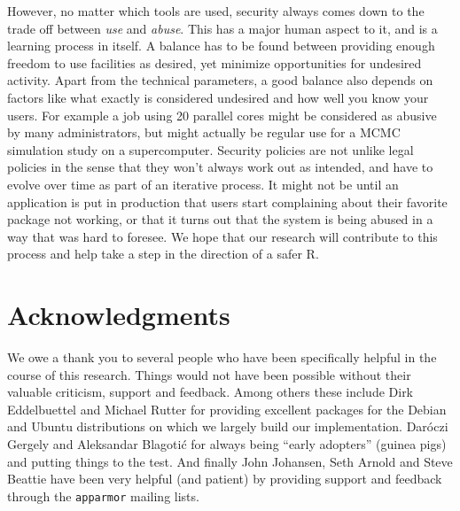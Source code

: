 \documentclass[article]{jss}
\newcommand{\R}{\textsf{R}\xspace}
\begin{document}
However, no matter which tools are used, security always comes down to the trade
off between \emph{use} and \emph{abuse}. This has a major human aspect to it,
and is a learning process in itself. A balance has to be found between providing
enough freedom to use facilities as desired, yet minimize opportunities for
undesired activity. Apart from the technical parameters, a good balance also
depends on factors like what exactly is considered undesired and how well you
know your users. For example a job using 20 parallel cores might be considered
as abusive by many administrators, but might actually be regular use for a MCMC
simulation study on a supercomputer. Security policies are not unlike legal
policies in the sense that they won't always work out as intended, and have to
evolve over time as part of an iterative process. It might not be until an
application is put in production that users start complaining about their
favorite package not working, or that it turns out that the system is being
abused in a way that was hard to foresee. We hope that our research will
contribute to this process and help take a step in the direction of a safer \R.

\section{Acknowledgments}

We owe a thank you to several people who have been specifically helpful in the
course of this research. Things would not have been possible without their 
valuable criticism, support and feedback. Among others these include Dirk
Eddelbuettel and Michael Rutter for providing excellent packages for the Debian
and Ubuntu distributions on which we largely build our implementation. Daróczi
Gergely and Aleksandar Blagotić for always being ``early adopters'' (guinea
pigs) and putting things to the test. And finally John Johansen, Seth Arnold and
Steve Beattie have been very helpful (and patient) by providing support and
feedback through the \texttt{apparmor} mailing lists.
\end{document}
